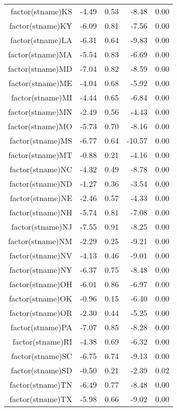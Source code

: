 \begin{table}[ht]
\begin{tabular}{rrrrr}
  factor(stname)KS & -4.49 & 0.53 & -8.48 & 0.00 \\ 
  factor(stname)KY & -6.09 & 0.81 & -7.56 & 0.00 \\ 
  factor(stname)LA & -6.31 & 0.64 & -9.83 & 0.00 \\ 
  factor(stname)MA & -5.54 & 0.83 & -6.69 & 0.00 \\ 
  factor(stname)MD & -7.04 & 0.82 & -8.59 & 0.00 \\ 
  factor(stname)ME & -4.04 & 0.68 & -5.92 & 0.00 \\ 
  factor(stname)MI & -4.44 & 0.65 & -6.84 & 0.00 \\ 
  factor(stname)MN & -2.49 & 0.56 & -4.43 & 0.00 \\ 
  factor(stname)MO & -5.73 & 0.70 & -8.16 & 0.00 \\ 
  factor(stname)MS & -6.77 & 0.64 & -10.57 & 0.00 \\ 
  factor(stname)MT & -0.88 & 0.21 & -4.16 & 0.00 \\ 
  factor(stname)NC & -4.32 & 0.49 & -8.78 & 0.00 \\ 
  factor(stname)ND & -1.27 & 0.36 & -3.54 & 0.00 \\ 
  factor(stname)NE & -2.46 & 0.57 & -4.33 & 0.00 \\ 
  factor(stname)NH & -5.74 & 0.81 & -7.08 & 0.00 \\ 
  factor(stname)NJ & -7.55 & 0.91 & -8.25 & 0.00 \\ 
  factor(stname)NM & -2.29 & 0.25 & -9.21 & 0.00 \\ 
  factor(stname)NV & -4.13 & 0.46 & -9.01 & 0.00 \\ 
  factor(stname)NY & -6.37 & 0.75 & -8.48 & 0.00 \\ 
  factor(stname)OH & -6.01 & 0.86 & -6.97 & 0.00 \\ 
  factor(stname)OK & -0.96 & 0.15 & -6.40 & 0.00 \\ 
  factor(stname)OR & -2.30 & 0.44 & -5.25 & 0.00 \\ 
  factor(stname)PA & -7.07 & 0.85 & -8.28 & 0.00 \\ 
  factor(stname)RI & -4.38 & 0.69 & -6.32 & 0.00 \\ 
  factor(stname)SC & -6.75 & 0.74 & -9.13 & 0.00 \\ 
  factor(stname)SD & -0.50 & 0.21 & -2.39 & 0.02 \\ 
  factor(stname)TN & -6.49 & 0.77 & -8.48 & 0.00 \\ 
  factor(stname)TX & -5.98 & 0.66 & -9.02 & 0.00 \\ 

\end{tabular}
\end{table}
